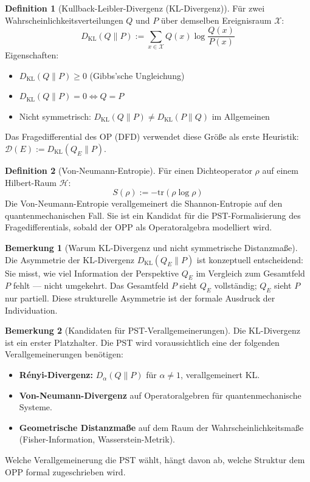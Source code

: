 \documentclass[11pt,a4paper]{article}
\theoremstyle{plain}
\theoremstyle{definition}
\newtheorem{definition}{Definition}[section]
\newtheorem{remark}{Bemerkung}[section]
\begin{document}
\begin{definition}[Kullback-Leibler-Divergenz (KL-Divergenz)]
F\"{u}r zwei Wahrscheinlichkeitsverteilungen $Q$ und $P$ \"{u}ber demselben
Ereignisraum $\mathcal{X}$:
\[
  D_{\mathrm{KL}}(Q \| P) := \sum_{x \in \mathcal{X}} Q(x) \log \frac{Q(x)}{P(x)}
\]
Eigenschaften:
\begin{itemize}
  \item $D_{\mathrm{KL}}(Q \| P) \geq 0$ (Gibbs'sche Ungleichung)
  \item $D_{\mathrm{KL}}(Q \| P) = 0 \iff Q = P$
  \item Nicht symmetrisch: $D_{\mathrm{KL}}(Q \| P) \neq D_{\mathrm{KL}}(P \| Q)$
        im Allgemeinen
\end{itemize}
Das Fragedifferential des OP (DFD) verwendet diese Gr\"{o}\ss{}e als erste Heuristik:
$\mathcal{D}(E) := D_{\mathrm{KL}}(Q_E \| P)$.
\end{definition}

\begin{definition}[Von-Neumann-Entropie]
F\"{u}r einen Dichteoperator $\rho$ auf einem Hilbert-Raum $\mathcal{H}$:
\[
  S(\rho) := -\mathrm{tr}(\rho \log \rho)
\]
Die Von-Neumann-Entropie verallgemeinert die Shannon-Entropie auf den
quantenmechanischen Fall. Sie ist ein Kandidat f\"{u}r die PST-Formalisierung des
Fragedifferentials, sobald der OPP als Operatoralgebra modelliert wird.
\end{definition}

\begin{remark}[Warum KL-Divergenz und nicht symmetrische Distanzma\ss{}e]
Die Asymmetrie der KL-Divergenz $D_{\mathrm{KL}}(Q_E \| P)$ ist konzeptuell
entscheidend: Sie misst, wie viel Information der Perspektive $Q_E$ im Vergleich zum
Gesamtfeld $P$ fehlt --- nicht umgekehrt. Das Gesamtfeld $P$ \glqq{}sieht\grqq{}
$Q_E$ vollst\"{a}ndig; $Q_E$ \glqq{}sieht\grqq{} $P$ nur partiell. Diese strukturelle
Asymmetrie ist der formale Ausdruck der Individuation.
\end{remark}

\begin{remark}[Kandidaten f\"{u}r PST-Verallgemeinerungen]
Die KL-Divergenz ist ein erster Platzhalter. Die PST wird voraussichtlich eine der
folgenden Verallgemeinerungen ben\"{o}tigen:
\begin{itemize}
  \item \textbf{R\'{e}nyi-Divergenz:} $D_\alpha(Q \| P)$ f\"{u}r $\alpha \neq 1$,
        verallgemeinert KL.
  \item \textbf{Von-Neumann-Divergenz} auf Operatoralgebren f\"{u}r quantenmechanische
        Systeme.
  \item \textbf{Geometrische Distanzma\ss{}e} auf dem Raum der Wahrscheinlichkeits\-ma\ss{}e
        (Fisher-Information, Wasserstein-Metrik).
\end{itemize}
Welche Verallgemeinerung die PST w\"{a}hlt, h\"{a}ngt davon ab, welche Struktur dem
OPP formal zugeschrieben wird.
\end{remark}
\end{document}
